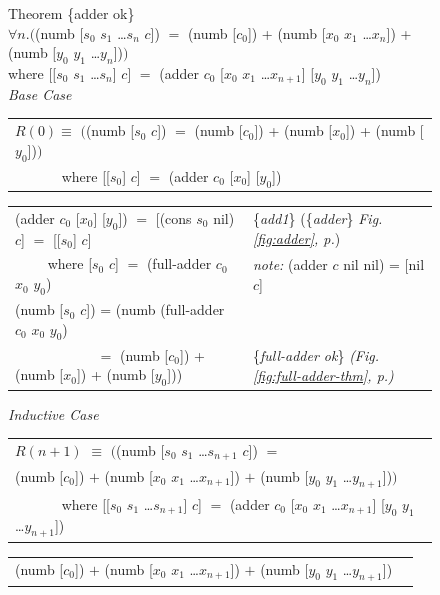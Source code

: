 \begin{figure}
Theorem \{adder ok\}\\
$\forall n.($(numb [$s_0$ $s_1$ \dots $s_{n}$ $c$]) $=$
(numb [$c_0$]) + (numb [$x_0$ $x_1$ \dots $x_{n}$]) + (numb [$y_0$ $y_1$ \dots $y_{n}$])$)$\\
\hphantom{numb}where [[$s_0$ $s_1$ \dots $s_{n}$] $c$] $=$ (adder $c_0$ [$x_0$ $x_1$ \dots $x_{n+1}$] [$y_0$ $y_1$ \dots $y_{n}$])\\
\emph{Base Case}
\begin{center}
\begin{tabular}{l}
\hline
$R(0) \equiv$  $($(numb [$s_0$ $c$]) $=$ (numb [$c_0$]) + (numb [$x_0$]) + (numb [$y_0$])$)$ \\
 ~~~~~~ where [[$s_0$] $c$] $=$ (adder $c_0$ [$x_0$] [$y_0$]) \\
\hline
\end{tabular}
\begin{tabular}{ll}
(adder $c_0$ [$x_0$] [$y_0$]) $=$ [(cons $s_0$ nil) $c$] $=$ [[$s_0$] $c$] & \{\emph{add1}\} (\{\emph{adder}\} \emph{Fig. \ref{fig:adder}, p.\pageref{fig:adder}}) \\
~~~~ where [$s_0$ $c$] $=$ (full-adder $c_0$ $x_0$ $y_0$)          & \emph{note:} (adder $c$ nil nil) = [nil $c$] \\
(numb [$s_0$ $c$]) = (numb (full-adder $c_0$ $x_0$ $y_0$)          &  \\
~~~~~~~~~~~ $=$ (numb [$c_0$]) + (numb [$x_0$]) + (numb [$y_0$]))  & \{\emph{full-adder ok}\} \emph{(Fig. \ref{fig:full-adder-thm}, p.\pageref{fig:full-adder-thm})}\\
\end{tabular}
\end{center}
\emph{Inductive Case}
\begin{center}
\begin{tabular}{l}
 \hline
$R(n+1)$ $\equiv$ $($(numb [$s_0$ $s_1$ \dots $s_{n+1}$ $c$]) $=$ \\
\hphantom{$R(n+1)$ $\equiv$ $($}(numb [$c_0$]) $+$ (numb [$x_0$ $x_1$ \dots $x_{n+1}$]) $+$ (numb [$y_0$ $y_1$ \dots $y_{n+1}$])$)$ \\
 ~~~~~~ where [[$s_0$ $s_1$ \dots $s_{n+1}$] $c$] $=$ (adder $c_0$ [$x_0$ $x_1$ \dots $x_{n+1}$] [$y_0$ $y_1$ \dots $y_{n+1}$]) \\
\hline
\end{tabular}
\begin{tabular}{ll}
(numb [$c_0$]) $+$ (numb [$x_0$ $x_1$ \dots $x_{n+1}$]) $+$ (numb [$y_0$ $y_1$ \dots $y_{n+1}$])          & \\

\end{tabular}
\end{center}
\end{figure}
